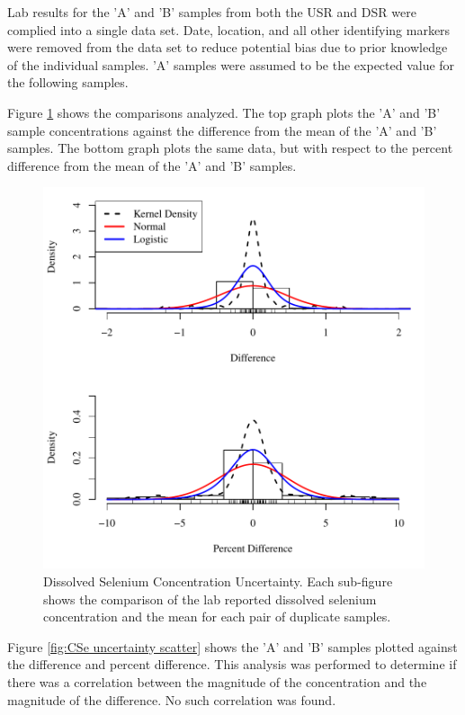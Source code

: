 Lab results for the 'A' and 'B' samples from both the USR and DSR were complied into a single data set.  Date, location, and all other identifying markers were removed from the data set to reduce potential bias due to prior knowledge of the individual samples.  'A' samples were assumed to be the expected value for the following samples.  

Figure \ref{fig:CSe uncertainty} shows the comparisons analyzed.  The top graph plots the 'A' and 'B' sample concentrations against the difference from the mean of the 'A' and 'B' samples.  The bottom graph plots the same data, but with respect to the percent difference from the mean of the 'A' and 'B' samples.
\begin{figure}[htbp]
	\begin{center}
		\includegraphics[width=6in]{"Figures/Results_USR/Stochastic/CSe Error"}
		\caption[Dissolved Selenium Concentration Uncertainty.]{Dissolved Selenium Concentration Uncertainty.  Each sub-figure shows the comparison of the lab reported dissolved selenium concentration and the mean for each pair of duplicate samples.}
		\label{fig:CSe uncertainty}
	\end{center}
\end{figure}

Figure \ref{fig:CSe uncertainty scatter} shows the 'A' and 'B' samples plotted against the difference and percent difference.  This analysis was performed to determine if there was a correlation between the magnitude of the concentration and the magnitude of the difference.  No such correlation was found.

